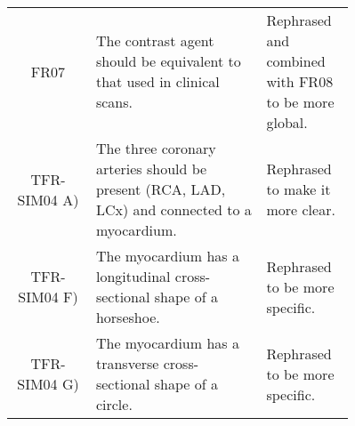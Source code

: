 \begin{table} [H]
\begin{tabular}{|c|p{0.5\linewidth}|p{0.26\linewidth}|}
		FR07 & The contrast agent should be equivalent to that used in clinical scans. & Rephrased and combined with FR08 to be more global. \\
		TFR-SIM04 A) & The three coronary arteries should be present (RCA, LAD, LCx) and connected to a myocardium. & Rephrased to make it more clear. \\
		TFR-SIM04 F) & The myocardium has a longitudinal cross-sectional shape of a horseshoe. & Rephrased to be more specific. \\
		TFR-SIM04 G) &  The myocardium has a transverse cross-sectional shape of a circle. & Rephrased to be more specific. \\
		\hline
	\end{tabular}
\end{table}